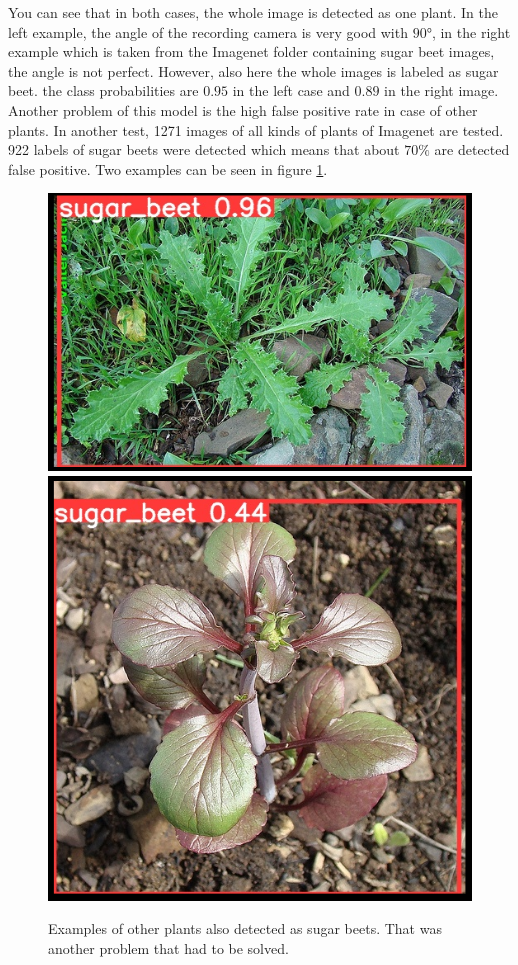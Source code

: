 You can see that in both cases, the whole image is detected as one plant. In the left example, the angle of the recording camera is very good with $ 90° $, in the right example which is taken from the Imagenet folder containing sugar beet images, the angle is not perfect. However, also here the whole images is labeled as sugar beet. the class probabilities are $ 0.95 $ in the left case and $ 0.89 $ in the right image.\\

Another problem of this model is the high false positive rate in case of other plants. In another test, 1271 images of all kinds of plants of Imagenet are tested. 922 labels of sugar beets were detected which means that about $ 70\% $ are detected false positive. Two examples can be seen in figure \ref{fig:false_positives}.

\begin{figure}[htb!]
	\centering
	\includegraphics[scale=0.458]{figures/false_positive_1.png}
	\includegraphics[scale=0.3]{figures/false_positive_2.png}
	\caption{Examples of other plants also detected as sugar beets. That was another problem that had to be solved.}
	\label{fig:false_positives}
\end{figure}

